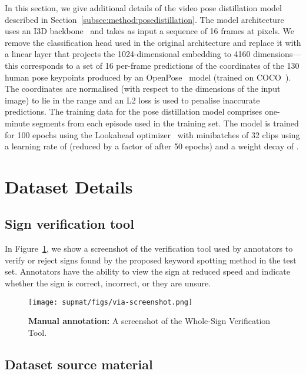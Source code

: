 In this section, we give additional details of the video pose distillation model described in
Section~\ref{subsec:method:posedistillation}.
The model architecture uses an I3D backbone~\cite{Carreira2017} and takes as input a sequence of 16 frames at  pixels. We remove the classification head used in the original architecture and replace it with a linear layer that projects the 1024-dimensional embedding to 4160 dimensions---this corresponds to a set of 16 per-frame predictions of the  coordinates of the 130 human pose keypoints produced by an OpenPose~\cite{cao2018openpose} model (trained on COCO~\cite{lin2014microsoft}).  The coordinates are normalised (with respect to the dimensions of the input image) to lie in the range  and an L2 loss is used to penalise inaccurate predictions.  The training data for the pose distillation model comprises one-minute segments from each episode used in the \datasetName{} training set.  The model is trained for 100 epochs using the Lookahead optimizer~\cite{zhang2019lookahead} with minibatches of 32 clips using a learning rate of  (reduced by a factor of  after 50 epochs) and a weight decay of .  


\section{\datasetName{} Dataset Details} \label{app:sec:dataset}
\subsection{Sign verification tool}

In Figure~\ref{app:fig:verification-tool}, we show a screenshot of the verification tool used by annotators to verify or reject signs found by the proposed keyword spotting method in the test set.  Annotators have the ability to view the sign at reduced speed and indicate whether the sign is correct, incorrect, or they are unsure.

\begin{figure}[t]
    \centering
    \texttt{[image: supmat/figs/via-screenshot.png]}
    \caption{\textbf{Manual annotation:} A screenshot of the Whole-Sign Verification Tool.}
    \label{app:fig:verification-tool}
\end{figure}


\subsection{Dataset source material} \label{app:subsec:episodes}

